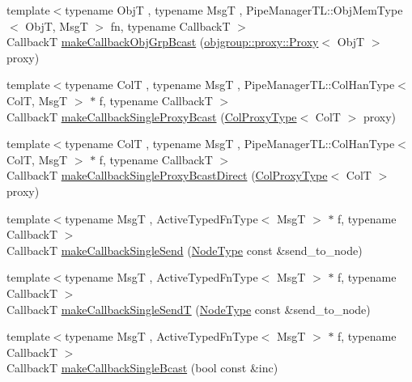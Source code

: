 \begin{DoxyCompactItemize}
\item 
{\footnotesize template$<$typename ObjT , typename MsgT , Pipe\+Manager\+T\+L\+::\+Obj\+Mem\+Type$<$ Obj\+T, Msg\+T $>$ fn, typename CallbackT $>$ }\\CallbackT \hyperlink{structvt_1_1pipe_1_1_pipe_manager_t_l_a9caf63b8c6577acd4884933c1b9cc886}{make\+Callback\+Obj\+Grp\+Bcast} (\hyperlink{structvt_1_1objgroup_1_1proxy_1_1_proxy}{objgroup\+::proxy\+::\+Proxy}$<$ ObjT $>$ proxy)
\item 
{\footnotesize template$<$typename ColT , typename MsgT , Pipe\+Manager\+T\+L\+::\+Col\+Han\+Type$<$ Col\+T, Msg\+T $>$ $\ast$ f, typename CallbackT $>$ }\\CallbackT \hyperlink{structvt_1_1pipe_1_1_pipe_manager_t_l_aff5140772699150c68dc912017e3a670}{make\+Callback\+Single\+Proxy\+Bcast} (\hyperlink{structvt_1_1pipe_1_1_pipe_manager_t_l_af56c58cad882496e35f01227d4da3898}{Col\+Proxy\+Type}$<$ ColT $>$ proxy)
\item 
{\footnotesize template$<$typename ColT , typename MsgT , Pipe\+Manager\+T\+L\+::\+Col\+Han\+Type$<$ Col\+T, Msg\+T $>$ $\ast$ f, typename CallbackT $>$ }\\CallbackT \hyperlink{structvt_1_1pipe_1_1_pipe_manager_t_l_a41fec001a4e698cb2bac888a6a48d606}{make\+Callback\+Single\+Proxy\+Bcast\+Direct} (\hyperlink{structvt_1_1pipe_1_1_pipe_manager_t_l_af56c58cad882496e35f01227d4da3898}{Col\+Proxy\+Type}$<$ ColT $>$ proxy)
\item 
{\footnotesize template$<$typename MsgT , Active\+Typed\+Fn\+Type$<$ Msg\+T $>$ $\ast$ f, typename CallbackT $>$ }\\CallbackT \hyperlink{structvt_1_1pipe_1_1_pipe_manager_t_l_ab160500f39018d96e56743095a1869e8}{make\+Callback\+Single\+Send} (\hyperlink{namespacevt_a866da9d0efc19c0a1ce79e9e492f47e2}{Node\+Type} const \&send\+\_\+to\+\_\+node)
\item 
{\footnotesize template$<$typename MsgT , Active\+Typed\+Fn\+Type$<$ Msg\+T $>$ $\ast$ f, typename CallbackT $>$ }\\CallbackT \hyperlink{structvt_1_1pipe_1_1_pipe_manager_t_l_ac4d276c82d9f04628263ffd07841fdcf}{make\+Callback\+Single\+SendT} (\hyperlink{namespacevt_a866da9d0efc19c0a1ce79e9e492f47e2}{Node\+Type} const \&send\+\_\+to\+\_\+node)
\item 
{\footnotesize template$<$typename MsgT , Active\+Typed\+Fn\+Type$<$ Msg\+T $>$ $\ast$ f, typename CallbackT $>$ }\\CallbackT \hyperlink{structvt_1_1pipe_1_1_pipe_manager_t_l_a833e03e949cc04c1a801780eb71fd7e1}{make\+Callback\+Single\+Bcast} (bool const \&inc)

\end{DoxyCompactItemize}
